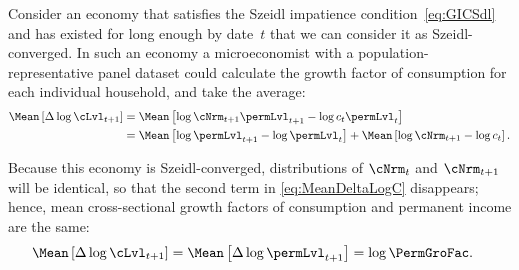 \documentclass[BufferStockTheory]{subfiles}
\begin{document}
Consider an economy that satisfies the Szeidl impatience condition~\eqref{eq:GICSdl} and has existed for long enough by date~$t$ that we can consider it as Szeidl-converged.  In such an economy a microeconomist with a population-representative panel dataset could calculate the growth factor of consumption for each individual household, and take the average:
\begin{equation}\label{eq:MeanDeltaLogC}
  \begin{split}
    \Mean\left[\Delta \log \cLvl_{t+1}\right]  & = \Mean\left[ \log {\cNrm}_{t+1}\permLvl_{t+1} - \log c_{t}\permLvl_{t}\right]  \\
    & = \Mean\left[ \log \permLvl_{t+1}- \log \permLvl_{t}\right] + \Mean\left[ \log {\cNrm}_{t+1} - \log c_{t}\right].
  \end{split}
\end{equation}

Because this economy is Szeidl-converged, distributions of $\cNrm_{t}$ and $\cNrm_{t+1}$ will be identical, so that the second term in  \eqref{eq:MeanDeltaLogC} disappears; hence, mean cross-sectional growth factors of consumption and permanent income are the same:
\begin{align}
  \Mean\left[\Delta \log \cLvl_{t+1}\right]  & = \Mean\left[ \Delta \log \permLvl_{t+1}\right] = \log \PermGroFac \label{eq:MeanDeltaLogCeqMeanDeltaLogP}.
\end{align}
\end{document}
